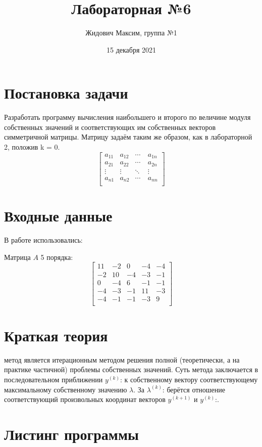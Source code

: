 \documentclass[12pt]{report}
\title{\vspace{-3cm}Лабораторная №6}
\author{Жидович Максим, группа №1}
\date{15 декабря 2021}
\begin{document}
\maketitle

\section{Постановка задачи}

Разработать программу вычисления наибольшего и второго по величине модуля
собственных значений и соответствующих им собственных векторов симметричной
матрицы.
Матрицу задаём таким же образом, как в лабораторной 2, положив k = 0.
\[
\begin{bmatrix}
a_{11} & a_{12}  & \cdots   & a_{1n}   \\
a_{21} & a_{22}  & \cdots   & a_{2n}  \\
\vdots & \vdots  & \ddots   & \vdots  \\
a_{n1} & a_{n2}  & \cdots\  & a_{nn}  \\
\end{bmatrix}
\]

\section{Входные данные}

В работе использовались:

Матрица $A$ 5 порядка:
\[ 
\begin{bmatrix}
11 & -2  & 0  & -4 & -4 \\
-2 & 10 & -4 & -3 & -1 \\
0 & -4 & 6 & -1 & -1 \\
-4 & -3 & -1 & 11 & -3 \\
-4 & -1 & -1 & -3 & 9 \\
\end{bmatrix}
\]

\section{Краткая теория}
 метод является итерационным методом решения полной
(теоретически, а на практике частичной) проблемы собственных значений.
Суть метода заключается в последовательном приближении $y^{(k)}$: к
собственному вектору соответствующему максимальному собственному
значению $\lambda$. За $\lambda^{(k)}$: берётся отношение соответствующий произвольных
координат векторов $y^{(k+1)}$ и $y^{(k)}$:.

\section{Листинг программы}
\end{document}
